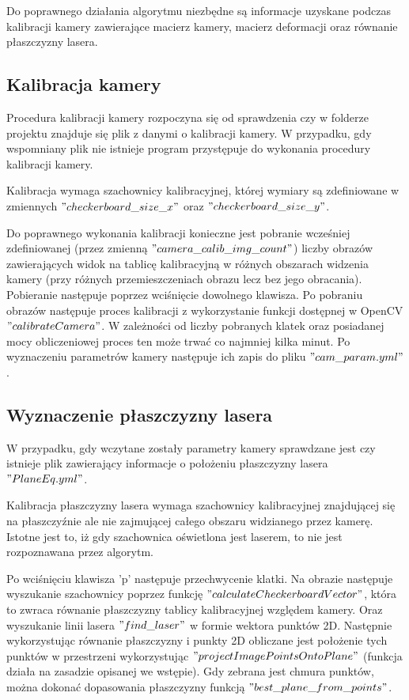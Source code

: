 \documentclass[conference]{IEEEtran}
\begin{document}
Do poprawnego działania algorytmu niezbędne są informacje uzyskane podczas kalibracji kamery zawierające macierz kamery, macierz deformacji oraz równanie płaszczyzny lasera.

\subsection{Kalibracja kamery}

Procedura kalibracji kamery rozpoczyna się od sprawdzenia czy w folderze projektu znajduje się plik z danymi o kalibracji kamery. W przypadku, gdy wspomniany plik nie istnieje program przystępuje do wykonania procedury kalibracji kamery.

Kalibracja wymaga szachownicy kalibracyjnej, której wymiary są zdefiniowane w zmiennych $"checkerboard\_size\_x"$ oraz $"checkerboard\_size\_y"$. 

Do poprawnego wykonania kalibracji konieczne jest pobranie wcześniej zdefiniowanej (przez zmienną $"camera\_calib\_img\_count"$) liczby obrazów zawierających widok na tablicę kalibracyjną w różnych obszarach widzenia kamery (przy różnych przemieszczeniach obrazu lecz bez jego obracania). Pobieranie następuje poprzez wciśnięcie dowolnego klawisza. Po pobraniu obrazów następuje proces kalibracji z wykorzystanie funkcji dostępnej w OpenCV $"calibrateCamera"$. W zależności od liczby pobranych klatek oraz posiadanej mocy obliczeniowej proces ten może trwać co najmniej kilka minut. Po wyznaczeniu parametrów kamery następuje ich zapis do pliku $"cam\_param.yml"$.

\subsection{Wyznaczenie płaszczyzny lasera}

W przypadku, gdy wczytane zostały parametry kamery sprawdzane jest czy istnieje plik zawierający informacje o położeniu płaszczyzny lasera $"PlaneEq.yml"$.

Kalibracja płaszczyzny lasera wymaga szachownicy kalibracyjnej znajdującej się na płaszczyźnie ale nie zajmującej całego obszaru widzianego przez kamerę. Istotne jest to, iż gdy szachownica oświetlona jest laserem, to nie jest rozpoznawana przez algorytm.

Po wciśnięciu klawisza 'p' następuje przechwycenie klatki. Na obrazie następuje wyszukanie szachownicy poprzez funkcję $"calculateCheckerboardVector"$, która to zwraca równanie płaszczyzny tablicy kalibracyjnej względem kamery. Oraz wyszukanie linii lasera $"find\_laser"$ w formie wektora punktów 2D. Następnie wykorzystując równanie płaszczyzny i punkty 2D obliczane jest położenie tych punktów w przestrzeni wykorzystując $"projectImagePointsOntoPlane"$ (funkcja działa na zasadzie opisanej we wstępie). Gdy zebrana jest chmura punktów, można dokonać dopasowania płaszczyzny funkcją $"best\_plane\_from\_points"$. 
\end{document}

